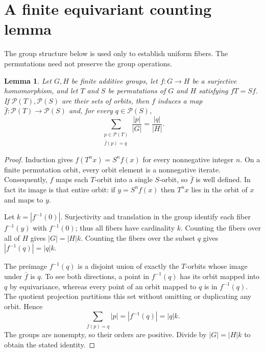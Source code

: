 \documentclass[11pt]{article}
\newtheorem{lemma}[theorem]{Lemma}
\begin{document}
\section{A finite equivariant counting lemma}
The group structure below is used only to establish uniform fibers.
The permutations need not preserve the group operations.

\begin{lemma}\label{lem:general}
Let $G,H$ be finite additive groups, let $f:G\to H$ be a surjective
homomorphism, and let $T$ and $S$ be permutations of $G$ and $H$ satisfying
$fT=Sf$. If $\mathcal P(T),\mathcal P(S)$ are their sets of orbits, then $f$
induces a map $\bar f:\mathcal P(T)\to\mathcal P(S)$ and, for every
$q\in\mathcal P(S)$,
\[
 \sum_{\substack{p\in\mathcal P(T)\\\bar f(p)=q}}
 \frac{|p|}{|G|}=\frac{|q|}{|H|}.
\]
\end{lemma}
\begin{proof}
Induction gives $f(T^n x)=S^n f(x)$ for every nonnegative integer $n$.
On a finite permutation orbit, every orbit element is a nonnegative iterate.
Consequently, $f$ maps each $T$-orbit into a single $S$-orbit, so $\bar f$ is
well defined. In fact its image is that entire orbit: if $y=S^n f(x)$ then
$T^n x$ lies in the orbit of $x$ and maps to $y$.

Let $k=|f^{-1}(0)|$. Surjectivity and translation in the group identify each
fiber $f^{-1}(y)$ with $f^{-1}(0)$; thus all fibers have cardinality $k$.
Counting the fibers over all of $H$ gives $|G|=|H|k$. Counting the fibers over
the subset $q$ gives $|f^{-1}(q)|=|q|k$.

The preimage $f^{-1}(q)$ is a disjoint union of exactly the $T$-orbits whose
image under $\bar f$ is $q$. To see both directions, a point in $f^{-1}(q)$
has its orbit mapped into $q$ by equivariance, whereas every point of an orbit
mapped to $q$ is in $f^{-1}(q)$. The quotient projection partitions this set
without omitting or duplicating any orbit. Hence
\[
 \sum_{\bar f(p)=q}|p|=|f^{-1}(q)|=|q|k.
\]
The groups are nonempty, so their orders are positive. Divide by
$|G|=|H|k$ to obtain the stated identity.
\end{proof}
\end{document}
